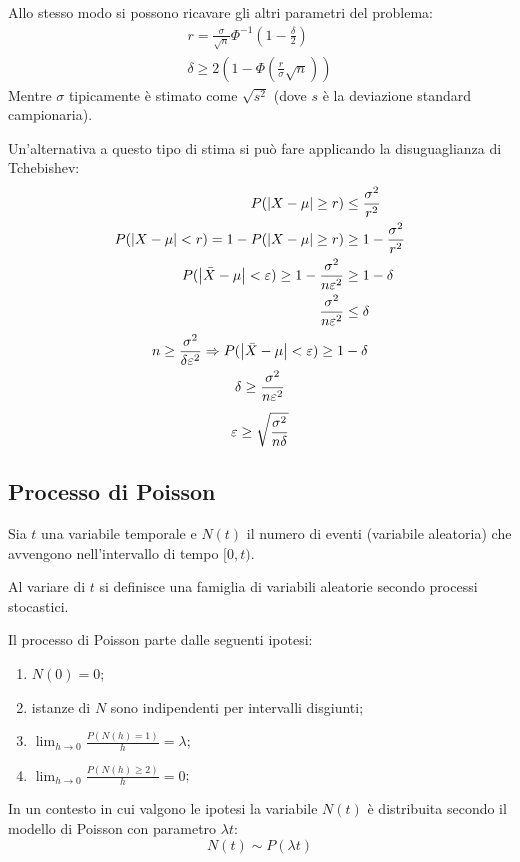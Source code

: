 Allo stesso modo si possono ricavare gli altri parametri del problema:
\begin{gather*}
	r = \frac{\sigma}{\sqrt{n}}\Phi^{-1}\left(1-\frac{\delta}{2}\right) \\
	\delta \geq 2\left(1-\Phi\left(\frac{r}{\sigma}\sqrt{n}\right)\right)
\end{gather*}
Mentre $\sigma$ tipicamente è stimato come $\sqrt{s^2}$ (dove $s$ è la deviazione standard campionaria).

Un'alternativa a questo tipo di stima si può fare applicando la disuguaglianza di Tchebishev:
\begin{align*}
	P(\left\lvert X-\mu \right\rvert\geq r)                                                       & \leq \frac{\sigma^2}{r^2}     \\
	P(\left\lvert X-\mu \right\rvert < r) = 1-P(\left\lvert X-\mu \right\rvert\geq r)                                & \geq 1 - \frac{\sigma^2}{r^2} \\
	P(\left\lvert \bar X-\mu \right\rvert < \varepsilon) \geq 1 - \frac{\sigma^2}{n\varepsilon^2} & \geq 1-\delta                 \\
	\frac{\sigma^2}{n\varepsilon^2}                                            & \leq \delta                   \\
\end{align*}
\begin{gather*}
	n \geq \frac{\sigma^2}{\delta\varepsilon^2} \Rightarrow P(\left\lvert \bar X-\mu \right\rvert<\varepsilon) \geq 1-\delta \\
	\delta\geq\frac{\sigma^2}{n\varepsilon^2} \\[1ex]
	\varepsilon \geq \sqrt{\frac{\sigma^2}{n\delta}}
\end{gather*}


\subsection{Processo di Poisson}
Sia $t$ una variabile temporale e $N(t)$ il numero di eventi (variabile aleatoria) che avvengono nell'intervallo di tempo $[0,t)$.

Al variare di $t$ si definisce una famiglia di variabili aleatorie secondo processi stocastici.

Il processo di Poisson parte dalle seguenti ipotesi:
\begin{enumerate}
	\item $N(0)=0$;
	\item istanze di $N$ sono indipendenti per intervalli disgiunti;
	\item $\displaystyle\lim_{h\to0}\frac{P(N(h)=1)}{h}=\lambda$;
	\item $\displaystyle\lim_{h\to0}\frac{P(N(h)\geq 2)}{h}=0$;
\end{enumerate}
In un contesto in cui valgono le ipotesi la variabile $N(t)$ è distribuita secondo il modello di Poisson con parametro $\lambda t$:
\begin{equation*}
	N(t)\sim P(\lambda t)
\end{equation*}

